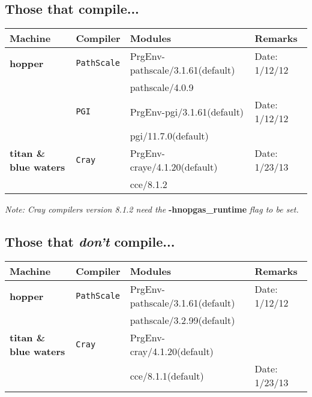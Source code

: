 \subsection{Those that compile...}

\begin{table*}[!h]
\begin{tabular}{|l|l|l|l|} \hline
Machine & Compiler & Modules & Remarks \\
\hline
{\bf hopper} & {\tt PathScale} & PrgEnv-pathscale/3.1.61(default) & Date: 1/12/12\\
& & pathscale/4.0.9 & \\
\cline{2-4}
& {\tt PGI} & PrgEnv-pgi/3.1.61(default) & Date: 1/12/12\\
& & pgi/11.7.0(default) & \\
\hline
{\bf titan \& blue waters} & {\tt Cray} & PrgEnv-craye/4.1.20(default) & Date: 1/23/13\\
& & cce/8.1.2 & \\
\hline
\end{tabular}
\label{Table:Those-that-compile}
\end{table*}
{\em Note: Cray compilers version 8.1.2 need the } {\bf -hnopgas\_runtime} {\em flag to be set.}

\subsection{Those that {\em don't} compile...}
\begin{table*}[!h]
\begin{tabular}{|l|l|l|l|} \hline
Machine & Compiler & Modules & Remarks \\
\hline
{\bf hopper} & {\tt PathScale} & PrgEnv-pathscale/3.1.61(default) & Date: 1/12/12\\
& & pathscale/3.2.99(default) & \\
\hline
{\bf titan \& blue waters} & {\tt Cray} & PrgEnv-cray/4.1.20(default) & \\
& & cce/8.1.1(default) & Date: 1/23/13\\
\hline
\end{tabular}
\label{Table:Those-that-dont-compile}
\end{table*}
